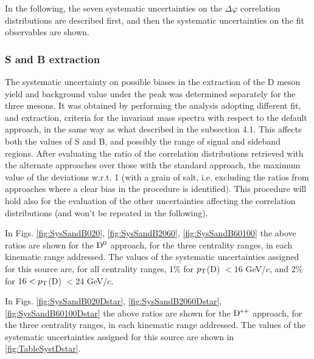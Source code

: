 In the following, the seven systematic uncertainties on the $\Delta\varphi$ correlation distributions are described first, and then the systematic uncertainties on the fit observables are shown.

\subsubsection{S and B extraction}
The systematic uncertainty on possible biases in the extraction of the D meson yield and background value under the peak was determined separately for the three mesons. It was obtained by performing the analysis adopting different fit, and extraction, criteria for the invariant mass spectra with respect to the default approach, in the same way as what described in the subsection 4.1. This affects both the values of S and B, and possibly the range of signal and sideband regions.
After evaluating the ratio of the correlation distributions retrieved with the alternate approaches over those with the standard approach, the maximum value of the deviations w.r.t. 1 (with a grain of salt, i.e. excluding the ratios from approaches where a clear bias in the procedure is identified).
This procedure will hold also for the evaluation of the other uncertainties affecting the correlation distributions (and won't be repeated in the following).

In Figs. \ref{fig:SysSandB020}, \ref{fig:SysSandB2060}, \ref{fig:SysSandB60100} the above ratios are shown for the ${\rm D^0}$ approach, for the three centrality ranges, in each kinematic range addressed. The values of the systematic uncertainties assigned for this source are, for all centrality ranges, 1\% for $p_{\rm T}$(D) $< 16$ GeV/$c$, and 2\% for $16 < p_{\rm T}$(D) $< 24$ GeV/$c$.

In Figs. \ref{fig:SysSandB020Dstar}, \ref{fig:SysSandB2060Dstar}, \ref{fig:SysSandB60100Dstar} the above ratios are shown for the ${\rm D^{*+}}$ approach, for the three centrality ranges, in each kinematic range addressed. The values of the systematic uncertainties assigned for this source are shown in \ref{fig:TableSystDstar}.

